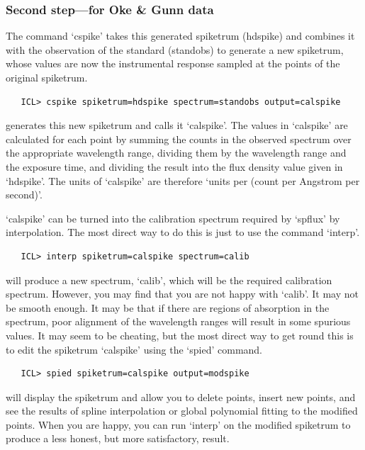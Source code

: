 \documentclass[11pt,twoside]{article}
\newcommand{\latorhtm}[2]{#1}
\newcommand{\latorhtm}[2]{#2}
\begin{document}

\subsubsection{\label{techno5ogsecond}Second step\latorhtm{---}{-}for Oke
   \& Gunn data}

   The command `cspike' takes this generated spiketrum (hdspike) and
   combines it with the observation of the standard (standobs) to
   generate a new spiketrum, whose values are now the instrumental
   response sampled at the points of the original spiketrum.

\begin{verbatim}
   ICL> cspike spiketrum=hdspike spectrum=standobs output=calspike
\end{verbatim}

   generates this new spiketrum and calls it `calspike'.  The values in
   `calspike' are calculated for each point by summing the counts in the
   observed spectrum over the appropriate wavelength range, dividing
   them by the wavelength range and the exposure time, and dividing the
   result into the flux density value given in `hdspike'.  The units of
   `calspike' are therefore `units per (count per Angstrom per second)'.

   `calspike' can be turned into the calibration spectrum required by
   `spflux' by interpolation.  The most direct way to do this is just to
   use the command `interp'.

\begin{verbatim}
   ICL> interp spiketrum=calspike spectrum=calib
\end{verbatim}

   will produce a new spectrum, `calib', which will be the required
   calibration spectrum.  However, you may find that you are not happy
   with `calib'.  It may not be smooth enough.  It may be that if there
   are regions of absorption in the spectrum, poor alignment of the
   wavelength ranges will result in some spurious values.  It may seem
   to be cheating, but the most direct way to get round this is to edit
   the spiketrum `calspike' using the `spied' command.

\begin{verbatim}
   ICL> spied spiketrum=calspike output=modspike
\end{verbatim}

   will display the spiketrum and allow you to delete points, insert new
   points, and see the results of spline interpolation or global
   polynomial fitting to the modified points.  When you are happy, you
   can run `interp' on the modified spiketrum to produce a less honest,
   but more satisfactory, result.
\end{document}
